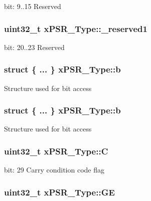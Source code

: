 bit\-: 9..15 Reserved \hypertarget{unionx_p_s_r___type_a790056bb6f20ea16cecc784b0dd19ad6}{
\subsubsection[{\-\_\-reserved1}]{\setlength{\rightskip}{0pt plus 5cm}uint32\-\_\-t x\-P\-S\-R\-\_\-\-Type\-::\-\_\-reserved1}}\label{unionx_p_s_r___type_a790056bb6f20ea16cecc784b0dd19ad6}
bit\-: 20..23 Reserved \hypertarget{unionx_p_s_r___type_ad60a0ab87ad28af113330426e90caee3}{
\subsubsection[{b}]{\setlength{\rightskip}{0pt plus 5cm}struct \{ ... \}   x\-P\-S\-R\-\_\-\-Type\-::b}}\label{unionx_p_s_r___type_ad60a0ab87ad28af113330426e90caee3}
Structure used for bit access \hypertarget{unionx_p_s_r___type_a42867881c11d9d77ff171fff21744af7}{
\subsubsection[{b}]{\setlength{\rightskip}{0pt plus 5cm}struct \{ ... \}   x\-P\-S\-R\-\_\-\-Type\-::b}}\label{unionx_p_s_r___type_a42867881c11d9d77ff171fff21744af7}
Structure used for bit access \hypertarget{unionx_p_s_r___type_a40213a6b5620410cac83b0d89564609d}{
\subsubsection[{C}]{\setlength{\rightskip}{0pt plus 5cm}uint32\-\_\-t x\-P\-S\-R\-\_\-\-Type\-::\-C}}\label{unionx_p_s_r___type_a40213a6b5620410cac83b0d89564609d}
bit\-: 29 Carry condition code flag \hypertarget{unionx_p_s_r___type_a2d0ec4ccae337c1df5658f8cf4632e76}{
\subsubsection[{G\-E}]{\setlength{\rightskip}{0pt plus 5cm}uint32\-\_\-t x\-P\-S\-R\-\_\-\-Type\-::\-G\-E}}\label{unionx_p_s_r___type_a2d0ec4ccae337c1df5658f8cf4632e76}
